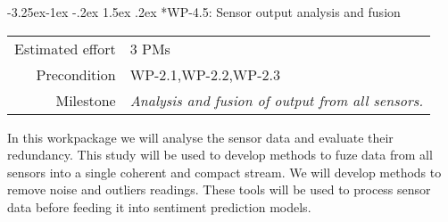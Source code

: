 \documentclass[12pt]{article}
\makeatletter
\renewcommand\paragraph{\@startsection{paragraph}{4}{\z@}%
  {-3.25ex\@plus -1ex \@minus -.2ex}%
  {1.5ex \@plus .2ex}%
  {\normalfont\normalsize\bfseries}}
\makeatother
\begin{document}
\paragraph*{WP-4.5: Sensor output analysis and fusion}
\begin{tabular}{rl}
	Estimated effort& 3 PMs\\
	Precondition & WP-2.1,WP-2.2,WP-2.3\\
	Milestone & \begin{minipage}[t]{12.2cm}
		\textit{Analysis and fusion of output from all sensors.}\vspace{.2cm}
	\end{minipage}
\end{tabular}

\noindent
In this workpackage we will analyse the sensor data and evaluate their redundancy. This study will be used to develop methods to fuze data from all sensors into a single coherent and compact stream. We will develop methods to remove noise and outliers readings. These tools will be used to process sensor data before feeding it into sentiment prediction models.

 
 
\end{document}
